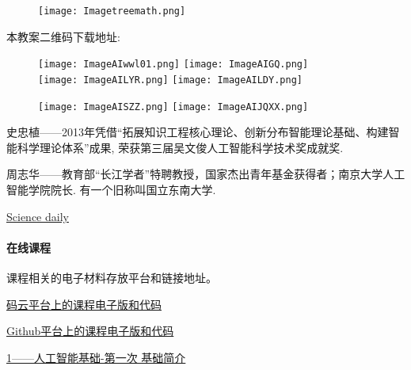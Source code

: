 \begin{pre}
	\thispagestyle{empty}
\begin{center}
  {}
\end{center}
\begin{center}
\begin{figure}[htbp]
	\centering
	\texttt{[image: Imagetreemath.png]}
\end{figure}
\end{center}
\begin{center}
    本教案二维码下载地址: 
\end{center}
\begin{center}
\begin{figure}[htbp]
	\centering
	\texttt{[image: ImageAIwwl01.png]}
    \texttt{[image: ImageAIGQ.png]}\\
    \texttt{[image: ImageAILYR.png]}
    \texttt{[image: ImageAILDY.png]}\\
\end{figure}
\begin{figure}[htbp]
    \texttt{[image: ImageAISZZ.png]}
    \texttt{[image: ImageAIJQXX.png]}
\end{figure}

史忠植——2013年凭借“拓展知识工程核心理论、创新分布智能理论基础、构建智能科学理论体系”成果, 荣获第三届吴文俊人工智能科学技术奖成就奖.

周志华——教育部“长江学者”特聘教授，国家杰出青年基金获得者；南京大学人工智能学院院长. 有一个旧称叫国立东南大学.
\end{center}

\href{https://www.sciencedaily.com/}{Science daily}

\paragraph{在线课程} 课程相关的电子材料存放平台和链接地址。

\href{https://gitee.com/zggl/AITeachingPlanDraft2020}{码云平台上的课程电子版和代码}

\href{https://github.com/zggl/AITeachingPlanDraft2020}{Github平台上的课程电子版和代码}

\href{https://ke.qq.com/webcourse/index.html?cid=1086628&term_id=101182654&lite=1&from=800021724#taid=5467185&vid=5285890799477964181}{1——人工智能基础-第一次 基础简介}


\end{pre}
